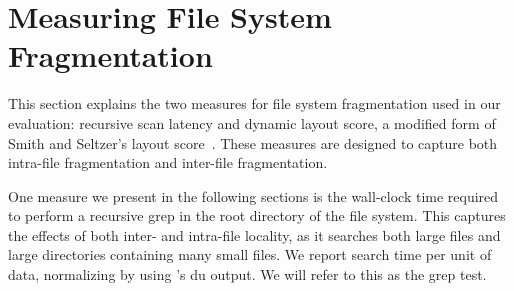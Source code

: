 \section{Measuring File System Fragmentation}\label{sec:fsa-metrics}

This section explains the two measures for file system fragmentation used in
our evaluation: recursive scan latency and dynamic layout score, a modified
form of Smith and Seltzer's layout score~\cite{SmithSe97}.  These measures are
designed to capture both intra-file fragmentation and inter-file fragmentation. 

 One measure we present in the following
sections is the wall-clock time required to perform a recursive grep
in the root directory of the file system.  This captures the effects of both
inter- and intra-file locality, as it searches both large files and large
directories containing many small files.  We report search time per unit of
data, normalizing by using \ext's du output.  We will refer to
this as the grep test. 




